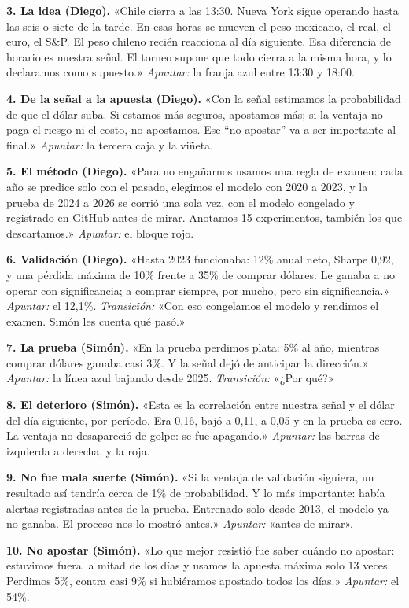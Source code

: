 \documentclass[11pt]{article}
\newcommand{\apunta}[1]{\textcolor{azul}{\emph{Apuntar:} #1}}
\begin{document}
\textbf{3. La idea (Diego).} «Chile cierra a las 13:30. Nueva York sigue operando hasta las seis o siete de la tarde. En esas horas se mueven el peso mexicano, el real, el euro, el S\&P. El peso chileno recién reacciona al día siguiente. Esa diferencia de horario es nuestra señal. El torneo supone que todo cierra a la misma hora, y lo declaramos como supuesto.» \apunta{la franja azul entre 13:30 y 18:00.}

\textbf{4. De la señal a la apuesta (Diego).} «Con la señal estimamos la probabilidad de que el dólar suba. Si estamos más seguros, apostamos más; si la ventaja no paga el riesgo ni el costo, no apostamos. Ese ``no apostar'' va a ser importante al final.» \apunta{la tercera caja y la viñeta.}

\textbf{5. El método (Diego).} «Para no engañarnos usamos una regla de examen: cada año se predice solo con el pasado, elegimos el modelo con 2020 a 2023, y la prueba de 2024 a 2026 se corrió una sola vez, con el modelo congelado y registrado en GitHub antes de mirar. Anotamos 15 experimentos, también los que descartamos.» \apunta{el bloque rojo.}

\textbf{6. Validación (Diego).} «Hasta 2023 funcionaba: 12\% anual neto, Sharpe 0,92, y una pérdida máxima de 10\% frente a 35\% de comprar dólares. Le ganaba a no operar con significancia; a comprar siempre, por mucho, pero sin significancia.» \apunta{el 12,1\%.} \emph{Transición:} «Con eso congelamos el modelo y rendimos el examen. Simón les cuenta qué pasó.»

\textbf{7. La prueba (Simón).} «En la prueba perdimos plata: 5\% al año, mientras comprar dólares ganaba casi 3\%. Y la señal dejó de anticipar la dirección.» \apunta{la línea azul bajando desde 2025.} \emph{Transición:} «¿Por qué?»

\textbf{8. El deterioro (Simón).} «Esta es la correlación entre nuestra señal y el dólar del día siguiente, por período. Era 0,16, bajó a 0,11, a 0,05 y en la prueba es cero. La ventaja no desapareció de golpe: se fue apagando.» \apunta{las barras de izquierda a derecha, y la roja.}

\textbf{9. No fue mala suerte (Simón).} «Si la ventaja de validación siguiera, un resultado así tendría cerca de 1\% de probabilidad. Y lo más importante: había alertas registradas antes de la prueba. Entrenado solo desde 2013, el modelo ya no ganaba. El proceso nos lo mostró antes.» \apunta{«antes de mirar».}

\textbf{10. No apostar (Simón).} «Lo que mejor resistió fue saber cuándo no apostar: estuvimos fuera la mitad de los días y usamos la apuesta máxima solo 13 veces. Perdimos 5\%, contra casi 9\% si hubiéramos apostado todos los días.» \apunta{el 54\%.}
\end{document}
